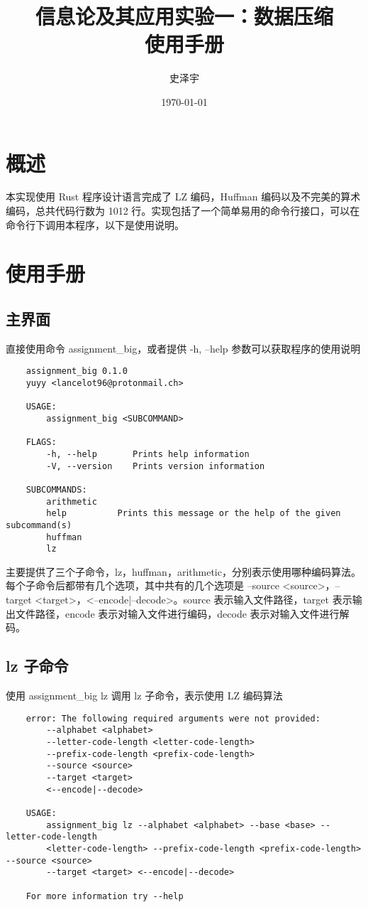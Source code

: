 \documentclass{ctexart}
\title{信息论及其应用实验一：数据压缩 \\ 使用手册}
\author{史泽宇}
\date{\today}
\begin{document}
\maketitle

\section{概述}

本实现使用 Rust 程序设计语言完成了 LZ 编码，Huffman 编码以及不完美的算术编码，总共代码行数为 1012 行。实现包括了一个简单易用的命令行接口，可以在命令行下调用本程序，以下是使用说明。

\section{使用手册}

\subsection{主界面}

直接使用命令 assignment\_big，或者提供 -h, --help 参数可以获取程序的使用说明

\begin{verbatim}
    assignment_big 0.1.0
    yuyy <lancelot96@protonmail.ch>

    USAGE:
        assignment_big <SUBCOMMAND>

    FLAGS:
        -h, --help       Prints help information
        -V, --version    Prints version information

    SUBCOMMANDS:
        arithmetic    
        help          Prints this message or the help of the given subcommand(s)
        huffman       
        lz
\end{verbatim}

主要提供了三个子命令，lz，huffman，arithmetic，分别表示使用哪种编码算法。每个子命令后都带有几个选项，其中共有的几个选项是 --source <source>，--target <target>，<--encode|--decode>。source 表示输入文件路径，target 表示输出文件路径，encode 表示对输入文件进行编码，decode 表示对输入文件进行解码。

\subsection{lz 子命令}

使用 assignment\_big lz 调用 lz 子命令，表示使用 LZ 编码算法

\begin{verbatim}
    error: The following required arguments were not provided:
        --alphabet <alphabet>
        --letter-code-length <letter-code-length>
        --prefix-code-length <prefix-code-length>
        --source <source>
        --target <target>
        <--encode|--decode>

    USAGE:
        assignment_big lz --alphabet <alphabet> --base <base> --letter-code-length
        <letter-code-length> --prefix-code-length <prefix-code-length> --source <source>
        --target <target> <--encode|--decode>

    For more information try --help
\end{verbatim}
\end{document}

